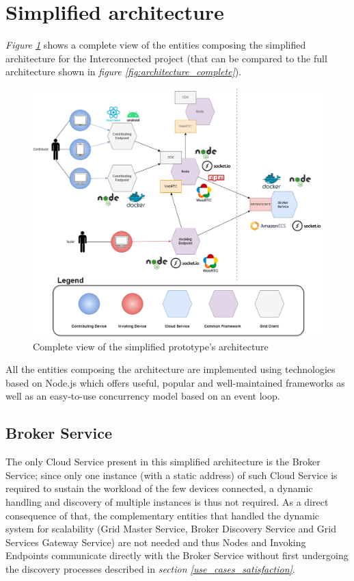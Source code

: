 \section{Simplified architecture}
\textit{Figure \ref{fig:simplified_architecture}} shows a complete view of the entities composing the simplified architecture for the Interconnected project (that can be compared to the full architecture shown in \textit{figure \ref{fig:architecture_complete}}).

\begin{figure}[!ht]
    \centering
    \includegraphics[width=\linewidth]{document/chapters/chapter_7/images/simplified_architecture.png}
    \caption{Complete view of the simplified prototype's architecture}
    \label{fig:simplified_architecture}
\end{figure}

\vspace{10mm}

All the entities composing the architecture are implemented using technologies based on Node.js which offers useful, popular and well-maintained frameworks as well as an easy-to-use concurrency model based on an event loop.

\subsection{Broker Service}
The only Cloud Service present in this simplified architecture is the Broker Service; since only one instance (with a static address) of such Cloud Service is required to sustain the workload of the few devices connected, a dynamic handling and discovery of multiple instances is thus not required. As a direct consequence of that, the complementary entities that handled the dynamic system for scalability (Grid Master Service, Broker Discovery Service and Grid Services Gateway Service) are not needed and thus Nodes and Invoking Endpoints communicate directly with the Broker Service without first undergoing the discovery processes described in \textit{section \ref{use_cases_satisfaction}}.

